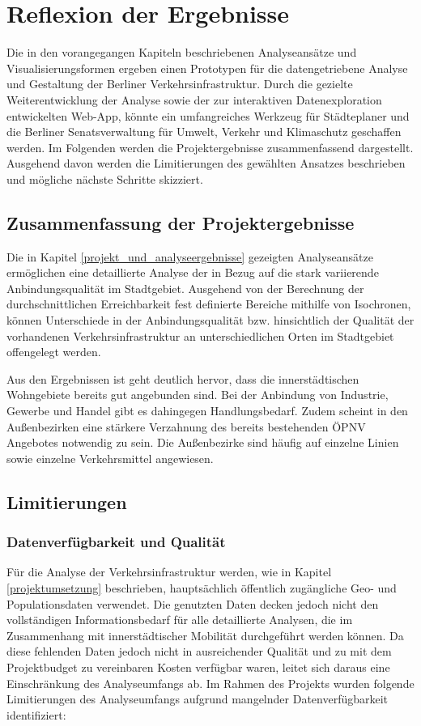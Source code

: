 \newpage
\section{Reflexion der Ergebnisse} \label{fazit}
Die in den vorangegangen Kapiteln beschriebenen Analyseansätze und Visualisierungsformen ergeben einen Prototypen für die datengetriebene Analyse und Gestaltung der Berliner Verkehrsinfrastruktur. Durch die gezielte Weiterentwicklung der Analyse sowie der zur interaktiven Datenexploration entwickelten Web-App, könnte ein umfangreiches Werkzeug für Städteplaner und die Berliner Senatsverwaltung für Umwelt, Verkehr und Klimaschutz geschaffen werden. Im Folgenden werden die Projektergebnisse zusammenfassend dargestellt. Ausgehend davon werden die Limitierungen des gewählten Ansatzes beschrieben und mögliche nächste Schritte skizziert.

\subsection{Zusammenfassung der Projektergebnisse}
Die in Kapitel \ref{projekt_und_analyseergebnisse} gezeigten Analyseansätze ermöglichen eine detaillierte Analyse der in Bezug auf die stark variierende Anbindungsqualität im Stadtgebiet. Ausgehend von der Berechnung der durchschnittlichen Erreichbarkeit fest definierte Bereiche mithilfe von Isochronen, können Unterschiede in der Anbindungsqualität bzw. hinsichtlich der Qualität der vorhandenen Verkehrsinfrastruktur an unterschiedlichen Orten im Stadtgebiet offengelegt werden.

Aus den Ergebnissen ist geht deutlich hervor, dass die innerstädtischen Wohngebiete bereits gut angebunden sind. Bei der Anbindung von Industrie, Gewerbe und Handel gibt es dahingegen Handlungsbedarf. Zudem scheint in den Außenbezirken eine stärkere Verzahnung des bereits bestehenden ÖPNV Angebotes notwendig zu sein. Die Außenbezirke sind häufig auf einzelne Linien sowie einzelne Verkehrsmittel angewiesen.

\subsection{Limitierungen}\label{limitierung}
\subsubsection{Datenverfügbarkeit und Qualität}
Für die Analyse der Verkehrsinfrastruktur werden, wie in Kapitel \ref{projektumsetzung} beschrieben, hauptsächlich öffentlich zugängliche Geo- und Populationsdaten verwendet. Die genutzten Daten decken jedoch nicht den vollständigen Informationsbedarf für alle detaillierte Analysen, die im Zusammenhang mit innerstädtischer Mobilität durchgeführt werden können. Da diese fehlenden Daten jedoch nicht in ausreichender Qualität und zu mit dem Projektbudget zu vereinbaren Kosten verfügbar waren, leitet sich daraus eine Einschränkung des Analyseumfangs ab. Im Rahmen des Projekts wurden folgende Limitierungen des Analyseumfangs aufgrund mangelnder Datenverfügbarkeit identifiziert:

